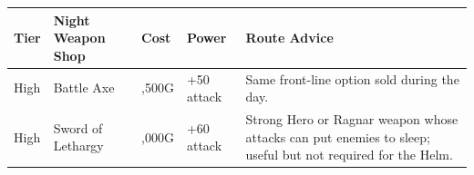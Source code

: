 \documentclass[
  american,
  10pt,
  letterpaper,
  oneside,
  open=any]{scrreprt}
\newcounter{none} %
\newenvironment{guidetable}{%
  \small\setstretch{1.0}%
  \setlength{\tabcolsep}{4pt}%
  \setlength{\LTpre}{8pt}\setlength{\LTpost}{10pt}%
  \renewcommand{\arraystretch}{1.16}%
}{ }
\begin{document}
\begin{guidetable}

{\def\LTcaptype{none} %
\begin{longtable}[]{@{}
  >{\raggedright\arraybackslash}p{}
  >{\raggedright\arraybackslash}p{}
  >{\raggedleft\arraybackslash}p{}
  >{\raggedleft\arraybackslash}p{}
  >{\raggedright\arraybackslash}p{}@{}}
\toprule\noalign{}
\begin{minipage}[b]{\linewidth}\raggedright
\color{GuideGreen}\bfseries Tier
\end{minipage} & \begin{minipage}[b]{\linewidth}\raggedright
\color{GuideGreen}\bfseries Night Weapon Shop
\end{minipage} & \begin{minipage}[b]{\linewidth}\raggedleft
\color{GuideGreen}\bfseries Cost
\end{minipage} & \begin{minipage}[b]{\linewidth}\raggedleft
\color{GuideGreen}\bfseries Power
\end{minipage} & \begin{minipage}[b]{\linewidth}\raggedright
\color{GuideGreen}\bfseries Route Advice
\end{minipage} \\
\midrule\noalign{}
\endhead
\bottomrule\noalign{}
\endlastfoot
High & Battle Axe & 5,500G & +50 attack & Same front-line option sold
during the day. \\
High & Sword of Lethargy & 8,000G & +60 attack & Strong Hero or Ragnar
weapon whose attacks can put enemies to sleep; useful but not required
for the Helm. \\
\end{longtable}
}

\end{guidetable}
\end{document}
